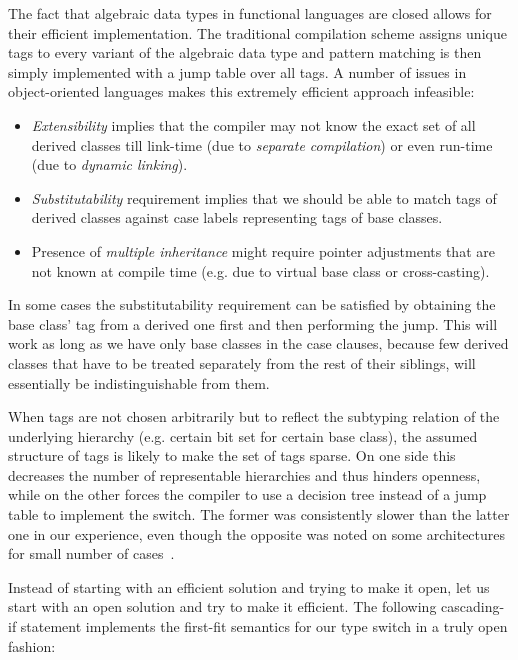 The fact that algebraic data types in functional languages are closed allows for 
their efficient implementation. The traditional compilation scheme assigns unique 
tags to every variant of the algebraic data type and pattern matching is then 
simply implemented with a jump table over all tags. A number of issues in 
object-oriented languages makes this extremely efficient approach infeasible:

\begin{itemize}
\setlength{\itemsep}{0pt}
\setlength{\parskip}{0pt}
\item \emph{Extensibility} implies that the compiler may not know the exact set 
      of all derived classes till link-time (due to \emph{separate compilation}) 
      or even run-time (due to \emph{dynamic linking}).
\item \emph{Substitutability} requirement implies that we should be able to 
      match tags of derived classes against case labels representing tags of 
      base classes.
\item Presence of \emph{multiple inheritance} might require pointer adjustments 
      that are not known at compile time (e.g. due to virtual base class or 
      cross-casting).
\end{itemize}

\noindent
In some cases the substitutability requirement can be satisfied by obtaining 
the base class' tag from a derived one first and then performing the jump. 
This will work as long as we have only base classes in the case clauses, because 
few derived classes that have to be treated separately from the rest of their 
siblings, will essentially be indistinguishable from them.

When tags are not chosen arbitrarily but to reflect the subtyping relation of the 
underlying hierarchy (e.g. certain bit set for certain base class), the assumed 
structure of tags is likely to make the set of tags sparse. On one side this 
decreases the number of representable hierarchies and thus hinders openness, 
while on the other forces the compiler to use a decision tree instead of a jump 
table to implement the switch. The former was consistently slower than the 
latter one in our experience, even though the opposite was noted on some 
architectures for small number of cases~\cite[]{garrigue-98}.

Instead of starting with an efficient solution and trying to make it open, let us 
start with an open solution and try to make it efficient. The following 
cascading-if statement implements the first-fit semantics for our type switch in 
a truly open fashion:


